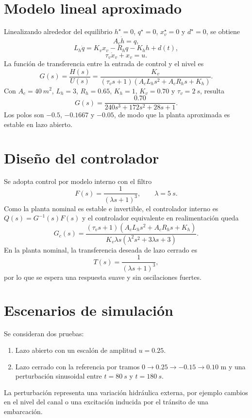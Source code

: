 \documentclass[conference]{IEEEtran}
\begin{document}
\section{Modelo lineal aproximado}
Linealizando alrededor del equilibrio $h^\star=0$, $q^\star=0$, $x_v^\star=0$ y $d^\star=0$, se obtiene
\begin{equation}
A_c \dot{h}=q,
\end{equation}
\begin{equation}
L_h \dot{q}=K_v x_v - R_h q - K_h h + d(t),
\end{equation}
\begin{equation}
\tau_v \dot{x}_v + x_v = u.
\end{equation}
La funci\'on de transferencia entre la entrada de control y el nivel es
\begin{equation}
G(s)=\frac{H(s)}{U(s)}=
\frac{K_v}{(\tau_v s+1)(A_cL_h s^2 + A_cR_h s + K_h)}.
\end{equation}
Con $A_c=\SI{40}{m^2}$, $L_h=3$, $R_h=0.65$, $K_h=1$, $K_v=0.70$ y $\tau_v=\SI{2}{s}$, resulta
\begin{equation}
G(s)=\frac{0.70}{240s^3 + 172s^2 + 28s + 1}.
\end{equation}
Los polos son $-0.5$, $-0.1667$ y $-0.05$, de modo que la planta aproximada es estable en lazo abierto.

\section{Dise\~no del controlador}
Se adopta control por modelo interno con el filtro
\begin{equation}
F(s)=\frac{1}{(\lambda s + 1)^3}, \qquad \lambda=\SI{5}{s}.
\end{equation}
Como la planta nominal es estable e invertible, el controlador interno es $Q(s)=G^{-1}(s)F(s)$ y el controlador equivalente en realimentaci\'on queda
\begin{equation}
G_c(s)=
\frac{(\tau_v s+1)(A_cL_h s^2 + A_cR_h s + K_h)}
{K_v \lambda s(\lambda^2 s^2 + 3\lambda s + 3)}.
\end{equation}
En la planta nominal, la transferencia deseada de lazo cerrado es
\begin{equation}
T(s)=\frac{1}{(\lambda s + 1)^3},
\end{equation}
por lo que se espera una respuesta suave y sin oscilaciones fuertes.

\section{Escenarios de simulaci\'on}
Se consideran dos pruebas:
\begin{enumerate}
\item Lazo abierto con un escal\'on de amplitud $u=0.25$.
\item Lazo cerrado con la referencia por tramos $0 \rightarrow 0.25 \rightarrow -0.15 \rightarrow 0.10$ m y una perturbaci\'on sinusoidal entre $t=\SI{80}{s}$ y $t=\SI{180}{s}$.
\end{enumerate}
La perturbaci\'on representa una variaci\'on hidr\'aulica externa, por ejemplo cambios en el nivel del canal o una excitaci\'on inducida por el tr\'ansito de una embarcaci\'on.
\end{document}
